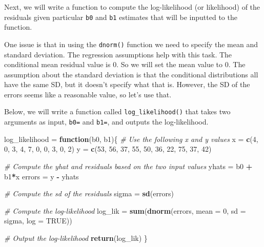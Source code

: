 \documentclass[]{book}
\newenvironment{Shaded}{\begin{snugshade}}{\end{snugshade}}
\newcommand{\CommentTok}[1]{\textcolor[rgb]{0.56,0.35,0.01}{\textit{#1}}}
\newcommand{\ControlFlowTok}[1]{\textcolor[rgb]{0.13,0.29,0.53}{\textbf{#1}}}
\newcommand{\DataTypeTok}[1]{\textcolor[rgb]{0.13,0.29,0.53}{#1}}
\newcommand{\DecValTok}[1]{\textcolor[rgb]{0.00,0.00,0.81}{#1}}
\newcommand{\KeywordTok}[1]{\textcolor[rgb]{0.13,0.29,0.53}{\textbf{#1}}}
\newcommand{\NormalTok}[1]{#1}
\newcommand{\OperatorTok}[1]{\textcolor[rgb]{0.81,0.36,0.00}{\textbf{#1}}}
\newcommand{\OtherTok}[1]{\textcolor[rgb]{0.56,0.35,0.01}{#1}}
\newcommand{\StringTok}[1]{\textcolor[rgb]{0.31,0.60,0.02}{#1}}
\begin{document}
Next, we will write a function to compute the log-likelihood (or likelihood) of the residuals given particular \texttt{b0} and \texttt{b1} estimates that will be inputted to the function.

One issue is that in using the \texttt{dnorm()} function we need to specify the mean and standard deviation. The regression assumptions help with this task. The conditional mean residual value is 0. So we will set the mean value to 0. The assumption about the standard deviation is that the conditional distributions all have the same SD, but it doesn't specify what that is. However, the SD of the errors seems like a reasonable value, so let's use that.

Below, we will write a function called \texttt{log\_likelihood()} that takes two arguments as input, \texttt{b0=} and \texttt{b1=}, and outputs the log-likelihood.

\begin{Shaded}
\begin{Highlighting}[]
\NormalTok{log_likelihood =}\StringTok{ }\ControlFlowTok{function}\NormalTok{(b0, b1)\{}
  \CommentTok{# Use the following x and y values}
\NormalTok{  x =}\StringTok{ }\KeywordTok{c}\NormalTok{(}\DecValTok{4}\NormalTok{, }\DecValTok{0}\NormalTok{, }\DecValTok{3}\NormalTok{, }\DecValTok{4}\NormalTok{, }\DecValTok{7}\NormalTok{, }\DecValTok{0}\NormalTok{, }\DecValTok{0}\NormalTok{, }\DecValTok{3}\NormalTok{, }\DecValTok{0}\NormalTok{, }\DecValTok{2}\NormalTok{)}
\NormalTok{  y =}\StringTok{ }\KeywordTok{c}\NormalTok{(}\DecValTok{53}\NormalTok{, }\DecValTok{56}\NormalTok{, }\DecValTok{37}\NormalTok{, }\DecValTok{55}\NormalTok{, }\DecValTok{50}\NormalTok{, }\DecValTok{36}\NormalTok{, }\DecValTok{22}\NormalTok{, }\DecValTok{75}\NormalTok{, }\DecValTok{37}\NormalTok{, }\DecValTok{42}\NormalTok{)}
  
  \CommentTok{# Compute the yhat and residuals based on the two input values}
\NormalTok{  yhats =}\StringTok{ }\NormalTok{b0 }\OperatorTok{+}\StringTok{ }\NormalTok{b1}\OperatorTok{*}\NormalTok{x}
\NormalTok{  errors =}\StringTok{ }\NormalTok{y }\OperatorTok{-}\StringTok{ }\NormalTok{yhats}
  
  \CommentTok{# Compute the sd of the residuals}
\NormalTok{  sigma =}\StringTok{ }\KeywordTok{sd}\NormalTok{(errors)}
  
  \CommentTok{# Compute the log-likelihood}
\NormalTok{  log_lik =}\StringTok{ }\KeywordTok{sum}\NormalTok{(}\KeywordTok{dnorm}\NormalTok{(errors, }\DataTypeTok{mean =} \DecValTok{0}\NormalTok{, }\DataTypeTok{sd =}\NormalTok{ sigma, }\DataTypeTok{log =} \OtherTok{TRUE}\NormalTok{))}
  
  \CommentTok{# Output the log-likelihood}
  \KeywordTok{return}\NormalTok{(log_lik)}
\NormalTok{\}}
\end{Highlighting}
\end{Shaded}
\end{document}
